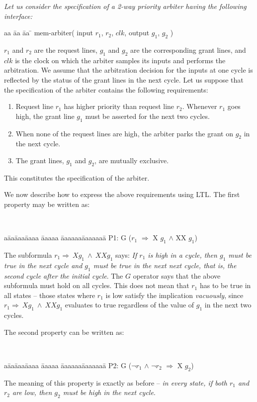 \begin{example} \label{ex2.1}
{\em
Let us consider the specification of a 2-way priority arbiter having the
following interface:
\begin{tabbing}
aa \= aa \= aa \= \kill
\> mem-arbiter( input $r_1$, $r_2$, $clk$, output $g_1$, $g_2$ )
\end{tabbing}
$r_1$ and $r_2$ are the request lines, $g_1$ and $g_2$ are the corresponding
grant lines, and $clk$ is the clock on which the arbiter samples its inputs
and performs the arbitration. We assume that the arbitration decision for the
inputs at one cycle is reflected by the status of the grant lines in the
next cycle. Let us suppose that the specification of the arbiter contains
the following requirements:
\begin{enumerate}
\item Request line $r_1$ has higher priority than request line $r_2$. Whenever
    $r_1$ goes high, the grant line $g_1$ must be asserted for the
    next two cycles.
\item When none of the request lines are high, the arbiter parks the grant
    on $g_2$ in the next cycle.
\item The grant lines, $g_1$ and $g_2$, are mutually exclusive.
\end{enumerate}
\noindent
This constitutes the specification of the arbiter.

\noindent
We now describe how to express the above requirements 
using LTL. The first property may be written as:
{\tt
\begin{tabbing}
a\= aa\= aaa\= aaaa \= aaaaa \= aaaaaa\= aaaaaaa\= \kill
\>\>\>\>\>\> P1: G ($r_1$ $\Rightarrow$  X $g_1$ $\land$  XX $g_1$)
\end{tabbing}
}
\noindent
The subformula $r_1 \Rightarrow\  Xg_1\ \land\  XXg_1$ says: {\em If $r_1$
is high in a cycle, then $g_1$ must be true in the next cycle and $g_1$
must be true in the next next cycle, that is, the second cycle after the
initial cycle}. The $G$ operator says that the
above subformula must hold on all cycles. This does not mean that $r_1$
has to be true in all states -- those states where $r_1$ is low satisfy the
implication {\em vacuously}, since $r_1 \Rightarrow\  Xg_1\ \land\  XXg_1$
evaluates to true regardless of the value of $g_1$ in the next two cycles.

\noindent
The second property can be written as:
{\tt
\begin{tabbing}
a\= aa\= aaa\= aaaa \= aaaaa \= aaaaaa\= aaaaaaa\= \kill
\>\>\>\>\>\> P2: G ($\neg r_1$ $\land$ $\neg r_2$ $\Rightarrow$  X $g_2$)
\end{tabbing}
}
\noindent
The meaning of this property is exactly as before -- {\em in every state,
if both $r_1$ and $r_2$ are low, then $g_2$ must be high in the next cycle}.

}
\end{example}
